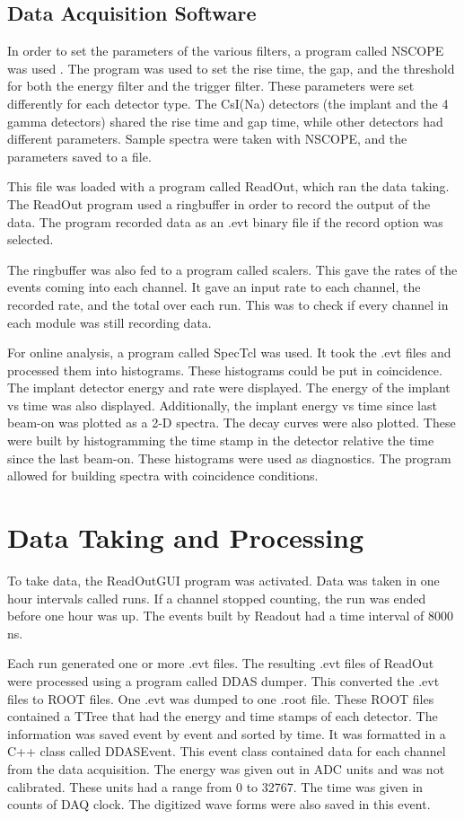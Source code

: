 \documentclass[../MaxHughesThesis.tex]{subfiles}
\begin{document}
\subsection{Data Acquisition Software}
In order to set the parameters of the various filters, a program called NSCOPE was used \cite{DAQ17}.
The program was used to set the rise time, the gap, and the threshold for both the energy filter and the trigger filter.
These parameters were set differently for each detector type.
The CsI(Na) detectors (the implant and the 4 gamma detectors) shared the rise time and gap time, while other detectors had different parameters.
Sample spectra were taken with NSCOPE, and the parameters saved to a file.

This file was loaded with a program called ReadOut, which ran the data taking.
The ReadOut program used a ringbuffer in order to record the output of the data.
The program recorded data as an .evt binary file if the record option was selected.

The ringbuffer was also fed to a program called scalers.
This gave the rates of the events coming into each channel.
It gave an input rate to each channel, the recorded rate, and the total over each run.
This was to check if every channel in each module was still recording data.

For online analysis, a program called SpecTcl was used.
It took the .evt files and processed them into histograms.
These histograms could be put in coincidence.
The implant detector energy and rate were displayed.
The energy of the implant vs time was also displayed.
Additionally, the implant energy vs time since last beam-on was plotted as a 2-D spectra.
The decay curves were also plotted.
These were built by histogramming the time stamp in the detector relative the time since the last beam-on.
These histograms were used as diagnostics. 
The program allowed for building spectra with coincidence conditions. 

\section{Data Taking and Processing}
To take data, the ReadOutGUI program was activated. 
Data was taken in one hour intervals called runs.
If a channel stopped counting, the run was ended before one hour was up. 
The events built by Readout had a time interval of 8000 ns.

Each run generated one or more .evt files. 
The resulting .evt files of ReadOut were processed using a program called DDAS dumper.
This converted the .evt files to ROOT files.
One .evt was dumped to one .root file. 
These ROOT files contained a TTree that had the energy and time stamps of each detector.
The information was saved event by event and sorted by time. 
It was formatted in a C++ class called DDASEvent. 
This event class contained data for each channel from the data acquisition.
The energy was given out in ADC units and was not calibrated.
These units had a range from 0 to 32767.
The time was given in counts of DAQ clock.
The digitized wave forms were also saved in this event. 
\end{document}

